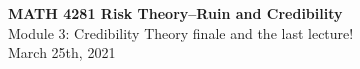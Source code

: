 \documentclass[11pt]{beamer}
\begin{document}
\begin{frame}
  \frametitle{}
  \begin{center}
    \textbf{\large MATH 4281 Risk Theory--Ruin and Credibility}\\
    \vspace{1cm}
    {\large  Module 3: Credibility Theory finale and \alert{the last lecture!}} \\
    \vspace{1cm}
    {\large  March 25th, 2021}
    \end{center}
    \vspace{1cm}
\end{frame}
\begin{frame}
\tableofcontents
\end{frame}
\end{document}
